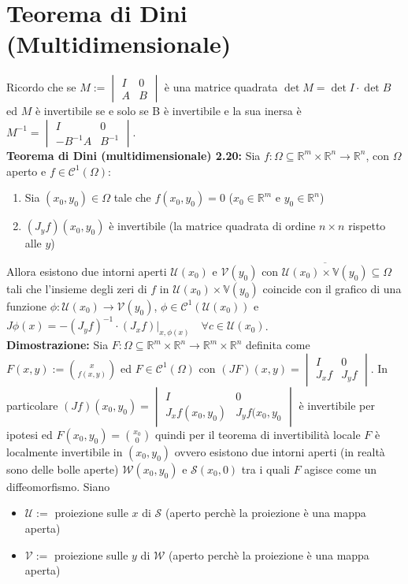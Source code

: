 \documentclass[a4paper,11pt,titlepage]{book}
\begin{document}
\section{Teorema di Dini (Multidimensionale)}

Ricordo che se $M:=\begin{vmatrix} I & 0 \\ A & B \end{vmatrix}$ è una matrice quadrata $\det M=\det I\cdot \det B$ ed $M$ è invertibile se e solo se B è invertibile e la sua inersa è $M^{-1}=\begin{vmatrix} I & 0 \\ -B^{-1}A & B^{-1} \end{vmatrix}$.\\

\textbf{Teorema di Dini (multidimensionale) 2.20:} Sia $f:\Omega\subseteq\mathbb{R}^m\times\mathbb{R}^n\to\mathbb{R}^n$, con $\Omega$ aperto e $f\in\mathcal{C}^1(\Omega)$:
\begin{enumerate}
\item Sia $(x_0,y_0)\in\Omega$ tale che $f(x_0,y_0)=0$ ($x_0\in\mathbb{R}^m$ e $y_0\in\mathbb{R}^n$)
\item $(J_yf)(x_0,y_0)$ è invertibile (la matrice quadrata di ordine $n\times n$ rispetto alle $y$)
\end{enumerate}

Allora esistono due intorni aperti $\mathcal{U}(x_0)$ e $\mathcal{V}(y_0)$ con $\overline{\mathcal{U}(x_0)\times\mathbb{V}(y_0)}\subseteq\Omega$ tali che l'insieme degli zeri di $f$ in $\mathcal{U}(x_0)\times\mathbb{V}(y_0)$ coincide con il grafico di una funzione $\phi:\mathcal{U}(x_0)\to\mathcal{V}(y_0)$, $\phi\in\mathcal{C}^1(\mathcal{U}(x_0))$ e $J\phi(x)=-(J_yf)^{-1}\cdot(J_xf)|_{x,\phi(x)}\quad\forall c\in\mathcal{U}(x_0)$.\\

\textbf{Dimostrazione:} Sia $F:\Omega\subseteq\mathbb{R}^m\times\mathbb{R}^n\to\mathbb{R}^m\times\mathbb{R}^n$ definita come $F(x,y):=\binom{x}{f(x,y)}$ ed $F\in\mathcal{C}^1(\Omega)$ con $(JF)(x,y)=\begin{vmatrix} I & 0 \\ J_xf & J_yf \end{vmatrix}$. In particolare $(Jf)(x_0,y_0)=\begin{vmatrix} I & 0 \\ J_xf(x_0,y_0) & J_yf(x_0,y_0 \end{vmatrix}$ è invertibile per ipotesi ed $F(x_0,y_0)=\binom{x_0}{0}$ quindi per il teorema di invertibilità locale $F$ è localmente invertibile in $(x_0,y_0)$ ovvero esistono due intorni aperti (in realtà sono delle bolle aperte) $\mathcal{W}(x_0,y_0)$ e $\mathcal{S}(x_0,0)$ tra i quali $F$ agisce come un diffeomorfismo. Siano\begin{itemize}
\item $\mathcal{U}:=$ proiezione sulle $x$ di $\mathcal{S}$ (aperto perchè la proiezione è una mappa aperta)
\item$\mathcal{V}:=$ proiezione sulle $y$ di $\mathcal{W}$ (aperto perchè la proiezione è una mappa aperta)\\
\end{itemize}
\end{document}
